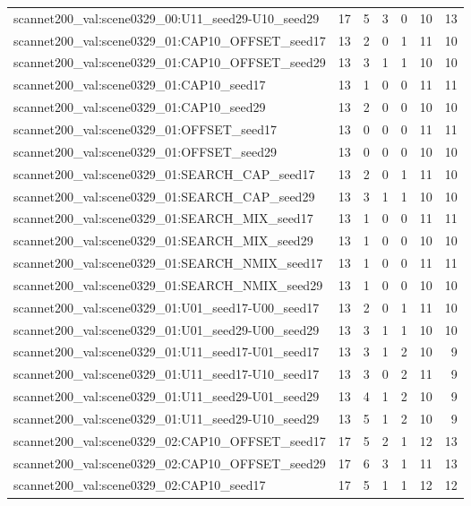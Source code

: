 \begin{table}[t]
\begin{tabular}{lrrrrrr}
scannet200\_val:scene0329\_00:U11\_seed29-U10\_seed29 & 17 & 5 & 3 & 0 & 10 & 13 \\
scannet200\_val:scene0329\_01:CAP10\_OFFSET\_seed17 & 13 & 2 & 0 & 1 & 11 & 10 \\
scannet200\_val:scene0329\_01:CAP10\_OFFSET\_seed29 & 13 & 3 & 1 & 1 & 10 & 10 \\
scannet200\_val:scene0329\_01:CAP10\_seed17 & 13 & 1 & 0 & 0 & 11 & 11 \\
scannet200\_val:scene0329\_01:CAP10\_seed29 & 13 & 2 & 0 & 0 & 10 & 10 \\
scannet200\_val:scene0329\_01:OFFSET\_seed17 & 13 & 0 & 0 & 0 & 11 & 11 \\
scannet200\_val:scene0329\_01:OFFSET\_seed29 & 13 & 0 & 0 & 0 & 10 & 10 \\
scannet200\_val:scene0329\_01:SEARCH\_CAP\_seed17 & 13 & 2 & 0 & 1 & 11 & 10 \\
scannet200\_val:scene0329\_01:SEARCH\_CAP\_seed29 & 13 & 3 & 1 & 1 & 10 & 10 \\
scannet200\_val:scene0329\_01:SEARCH\_MIX\_seed17 & 13 & 1 & 0 & 0 & 11 & 11 \\
scannet200\_val:scene0329\_01:SEARCH\_MIX\_seed29 & 13 & 1 & 0 & 0 & 10 & 10 \\
scannet200\_val:scene0329\_01:SEARCH\_NMIX\_seed17 & 13 & 1 & 0 & 0 & 11 & 11 \\
scannet200\_val:scene0329\_01:SEARCH\_NMIX\_seed29 & 13 & 1 & 0 & 0 & 10 & 10 \\
scannet200\_val:scene0329\_01:U01\_seed17-U00\_seed17 & 13 & 2 & 0 & 1 & 11 & 10 \\
scannet200\_val:scene0329\_01:U01\_seed29-U00\_seed29 & 13 & 3 & 1 & 1 & 10 & 10 \\
scannet200\_val:scene0329\_01:U11\_seed17-U01\_seed17 & 13 & 3 & 1 & 2 & 10 & 9 \\
scannet200\_val:scene0329\_01:U11\_seed17-U10\_seed17 & 13 & 3 & 0 & 2 & 11 & 9 \\
scannet200\_val:scene0329\_01:U11\_seed29-U01\_seed29 & 13 & 4 & 1 & 2 & 10 & 9 \\
scannet200\_val:scene0329\_01:U11\_seed29-U10\_seed29 & 13 & 5 & 1 & 2 & 10 & 9 \\
scannet200\_val:scene0329\_02:CAP10\_OFFSET\_seed17 & 17 & 5 & 2 & 1 & 12 & 13 \\
scannet200\_val:scene0329\_02:CAP10\_OFFSET\_seed29 & 17 & 6 & 3 & 1 & 11 & 13 \\
scannet200\_val:scene0329\_02:CAP10\_seed17 & 17 & 5 & 1 & 1 & 12 & 12 \\

\end{tabular}
\end{table}
